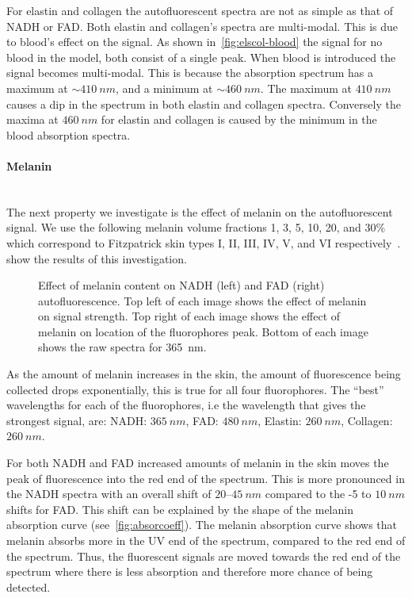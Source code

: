 For elastin and collagen the autofluorescent spectra are not as simple as that of NADH or FAD\@.
Both elastin and collagen's spectra are multi-modal.
This is due to blood's effect on the signal.
As shown in~\cref{fig:elscol-blood} the signal for no blood in the model, both consist of a single peak.
When blood is introduced the signal becomes multi-modal.
This is because the absorption spectrum has a maximum at $\sim410~nm$, and a minimum at $\sim460~nm$.
The maximum at $410~nm$ causes a dip in the spectrum in both elastin and collagen spectra.
Conversely the maxima at $460~nm$ for elastin and collagen is caused by the minimum in the blood absorption spectra.


\paragraph*{Melanin}\hspace{0pt}\\
The next property we investigate is the effect of melanin on the autofluorescent signal.
We use the following melanin volume fractions 1, 3, 5, 10, 20, and $30\%$ which correspond to Fitzpatrick skin types I, II, III, IV, V, and VI respectively~\cite{iglesias2015biophysically,fitzpatrick1988validity}.
 show the results of this investigation.

\begin{figure}[!htbp]
    \centering
    \caption{Effect of melanin content on NADH (left) and FAD (right) autofluorescence. Top left of each image shows the effect of melanin on signal strength. Top right of each image shows the effect of melanin on location of the fluorophores peak. Bottom of each image shows the raw spectra for 365~nm.}%
    \label{fig:nadhfad-mel}%
\end{figure}

As the amount of melanin increases in the skin, the amount of fluorescence being collected drops exponentially, this is true for all four fluorophores.
The ``best'' wavelengths for each of the fluorophores, i.e the wavelength that gives the strongest signal, are: NADH: $365~nm$, FAD: $480~nm$, Elastin: $260~nm$, Collagen: $260~nm$.

For both NADH and FAD increased amounts of melanin in the skin moves the peak of fluorescence into the red end of the spectrum.
This is more pronounced in the NADH spectra with an overall shift of $20$--$45~nm$ compared to the -5 to $10~nm$ shifts for FAD\@.
This shift can be explained by the shape of the melanin absorption curve (see~\cref{fig:absorcoeff}).
The melanin absorption curve shows that melanin absorbs more in the UV end of the spectrum, compared to the red end of the spectrum.
Thus, the fluorescent signals are moved towards the red end of the spectrum where there is less absorption and therefore more chance of being detected.


